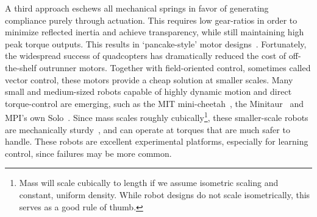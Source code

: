 \par
A third approach eschews all mechanical springs in favor of generating compliance purely through actuation. This requires low gear-ratios in order to minimize reflected inertia and achieve transparency, while still maintaining high peak torque outputs. This results in `pancake-style' motor designs~\cite{Seok2012proprioceptive}.
Fortunately, the widespread success of quadcopters has dramatically reduced the cost of off-the-shelf outrunner motors. Together with field-oriented control, sometimes called vector control, these motors provide a cheap solution at smaller scales. Many small and medium-sized robots capable of highly dynamic motion and direct torque-control are emerging, such as the MIT mini-cheetah~\cite{katz2019mini}, the Minitaur~\cite{kenneally2016design} and MPI's own Solo~\cite{grimminger2019open}. Since mass scales roughly cubically\footnote{Mass will scale cubically to length if we assume isometric scaling and constant, uniform density. While robot designs do not scale isometrically, this serves as a good rule of thumb.}, these smaller-scale robots are mechanically sturdy~\cite{biewener2005biomechanical}, and can operate at torques that are much safer to handle. These robots are excellent experimental platforms, especially for learning control, since failures may be more common. \par





